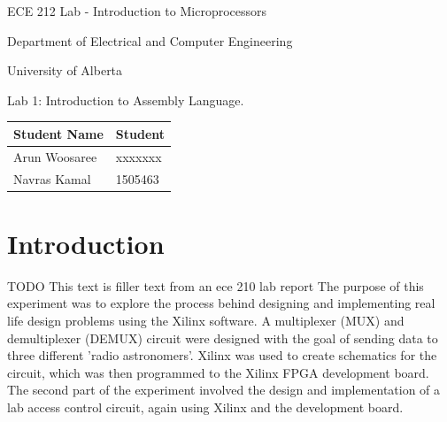 \documentclass[letterpaper]{article}
\begin{document}
  \begin{titlepage}
    \begin{center}

      \LARGE
      ECE 212 Lab - Introduction to Microprocessors

      Department of Electrical and Computer Engineering

      University of Alberta

      \vspace{2cm}

      Lab 1: Introduction to Assembly Language.

      \vspace{5cm}
      \Large

      \begin{tabular}{ | m{5cm} | m{5cm} | }
        \hline
        Student Name & Student \\
        \hline
        Arun Woosaree & xxxxxxx \\
        \hline
        Navras Kamal & 1505463 \\
        \hline
      \end{tabular}




    \end{center}
\end{titlepage}


\tableofcontents

\newpage

\section{Introduction}
TODO
  This text is filler text from an ece 210 lab report
  The purpose of this experiment was to explore the process behind designing and implementing real life design problems using the Xilinx software. A multiplexer (MUX) and demultiplexer (DEMUX) circuit were designed with the goal of sending data to three different 'radio astronomers'. Xilinx was used to create schematics for the circuit, which was then programmed to the Xilinx FPGA development board. The second part of the experiment involved the design and implementation of a lab access control circuit, again using Xilinx and the development board.
\end{document}
